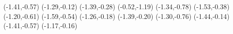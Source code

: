 \psdot[](-1.41,-0.57)
\psdot[](-1.29,-0.12)
\psdot[](-1.39,-0.28)
\psdot[](-0.52,-1.19)
\psdot[](-1.34,-0.78)
\psdot[](-1.53,-0.38)
\psdot[](-1.20,-0.61)
\psdot[](-1.59,-0.54)
\psdot[](-1.26,-0.18)
\psdot[](-1.39,-0.20)
\psdot[](-1.30,-0.76)
\psdot[](-1.44,-0.14)
\psdot[](-1.41,-0.57)
\psdot[](-1.17,-0.16)
